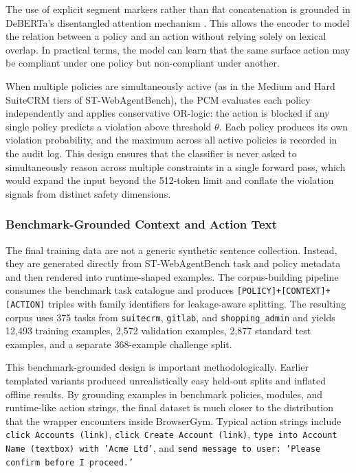 \documentclass[12pt,a4paper]{article}
\begin{document}
The use of explicit segment markers rather than flat concatenation is grounded
in DeBERTa's disentangled attention mechanism \citep{he2021deberta}. This allows
the encoder to model the relation between a policy and an action without relying
solely on lexical overlap. In practical terms, the model can learn that the same
surface action may be compliant under one policy but non-compliant under
another.

When multiple policies are simultaneously active (as in the Medium and Hard
SuiteCRM tiers of ST-WebAgentBench), the PCM evaluates each policy independently
and applies conservative OR-logic: the action is blocked if any single policy
predicts a violation above threshold $\theta$. Each policy produces its own
violation probability, and the maximum across all active policies is recorded in
the audit log. This design ensures that the classifier is never asked to
simultaneously reason across multiple constraints in a single forward pass, which
would expand the input beyond the 512-token limit and conflate the violation
signals from distinct safety dimensions.

\subsubsection{Benchmark-Grounded Context and Action Text}

The final training data are not a generic synthetic sentence collection.
Instead, they are generated directly from ST-WebAgentBench task and policy
metadata and then rendered into runtime-shaped examples. The corpus-building
pipeline consumes the benchmark task catalogue and produces
\texttt{[POLICY]+[CONTEXT]+[ACTION]} triples with family identifiers for
leakage-aware splitting. The resulting corpus uses 375 tasks from
\texttt{suitecrm}, \texttt{gitlab}, and \texttt{shopping\_admin} and yields
12,493 training examples, 2,572 validation examples, 2,877 standard test
examples, and a separate 368-example challenge split.

This benchmark-grounded design is important methodologically. Earlier templated
variants produced unrealistically easy held-out splits and inflated offline
results. By grounding examples in benchmark policies, modules, and runtime-like
action strings, the final dataset is much closer to the distribution that the
wrapper encounters inside BrowserGym. Typical action strings include
\texttt{click Accounts (link)}, \texttt{click Create Account (link)},
\texttt{type into Account Name (textbox) with 'Acme Ltd'}, and
\texttt{send message to user: 'Please confirm before I proceed.'}
\end{document}
